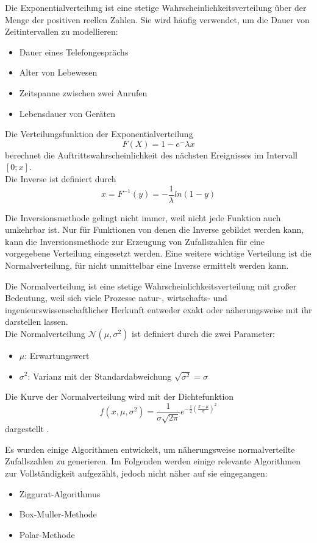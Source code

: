 Die Exponentialverteilung ist eine stetige Wahrscheinlichkeitsverteilung über der Menge der positiven reellen Zahlen. Sie wird häufig verwendet, um die Dauer von Zeitintervallen zu modellieren:
\begin{itemize}
    \item Dauer eines Telefongesprächs
    \item Alter von Lebewesen
    \item Zeitspanne zwischen zwei Anrufen
    \item Lebensdauer von Geräten
\end{itemize}
Die Verteilungsfunktion der Exponentialverteilung 
$$F(X)=1-e^-\lambda x$$
berechnet die Auftrittswahrscheinlichkeit des nächsten Ereignisses im Intervall $[0;x]$.\\
Die Inverse ist definiert durch
$$x=F^{-1}(y)=-\frac{1}{\lambda}ln(1-y)$$

Die Inversionsmethode gelingt nicht immer, weil nicht jede Funktion auch umkehrbar ist. Nur für Funktionen von denen die Inverse gebildet werden kann, kann die Inversionsmethode zur Erzeugung von Zufallszahlen für eine vorgegebene Verteilung eingesetzt werden. Eine weitere wichtige Verteilung ist die Normalverteilung, für nicht unmittelbar eine Inverse ermittelt werden kann. 

Die Normalverteilung ist eine stetige Wahrscheinlichkeitsverteilung mit großer Bedeutung, weil sich viele Prozesse natur-, wirtschafts- und ingenieurswissenschaftlicher Herkunft entweder exakt oder näherungsweise mit ihr darstellen lassen.\\ 
Die Normalverteilung $\mathcal{N}(\mu,\sigma ^2)$ ist definiert durch die zwei Parameter: 
\begin{itemize}
    \item $\mu$: Erwartungswert
    \item $\sigma^2$: Varianz mit der Standardabweichung $\sqrt{\sigma^2}=\sigma$
\end{itemize}
Die Kurve der Normalverteilung wird mit der Dichtefunktion
\medskip
$$f(x,\mu,\sigma^2)=\frac{1}{\sigma\sqrt{2\pi}}e^{-\frac{1}{2}(\frac{x-\mu}{\sigma})^2}$$
\medskip
dargestellt \cite{Inversionsmethode}.

Es wurden einige Algorithmen entwickelt, um näherungsweise normalverteilte Zufallszahlen zu generieren. Im Folgenden werden einige relevante Algorithmen zur Vollständigkeit aufgezählt, jedoch nicht näher auf sie eingegangen:
\begin{itemize}
    \item Ziggurat-Algorithmus
    \item Box-Muller-Methode
    \item Polar-Methode
\end{itemize}


